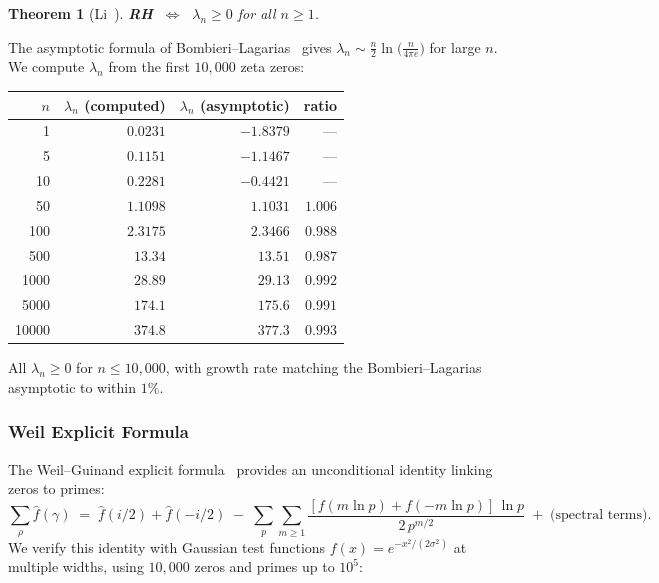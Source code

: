 \documentclass[11pt,a4paper]{article}
\theoremstyle{plain}
\newtheorem{theorem}{Theorem}[section]
\theoremstyle{remark}
\begin{document}
\begin{theorem}[Li~\cite{li1997}]\label{thm:li}
\textbf{RH} $\;\Longleftrightarrow\;$ $\lambda_n \geq 0$ for all $n\geq 1$.
\end{theorem}

\noindent The asymptotic formula of Bombieri--Lagarias~\cite{bombieri-lagarias1999}
gives $\lambda_n \sim \tfrac{n}{2}\ln\!\bigl(\tfrac{n}{4\pi e}\bigr)$
for large $n$.  We compute $\lambda_n$ from the first $10{,}000$ zeta
zeros:

\begin{center}\small
\begin{tabular}{@{}rrrr@{}}
\toprule
$n$ & $\lambda_n$ (computed) & $\lambda_n$ (asymptotic) & ratio\\
\midrule
1   & $0.0231$ & $-1.8379$ & ---\\
5   & $0.1151$ & $-1.1467$ & ---\\
10  & $0.2281$ & $-0.4421$ & ---\\
50  & $1.1098$ & $1.1031$ & $1.006$\\
100 & $2.3175$ & $2.3466$ & $0.988$\\
500 & $13.34$  & $13.51$  & $0.987$\\
1000& $28.89$ & $29.13$  & $0.992$\\
5000& $174.1$ & $175.6$  & $0.991$\\
10000& $374.8$ & $377.3$ & $0.993$\\
\bottomrule
\end{tabular}
\end{center}

\noindent All $\lambda_n \geq 0$ for $n\leq 10{,}000$, with growth rate
matching the Bombieri--Lagarias asymptotic to within $1\%$.

\subsubsection{Weil Explicit Formula}
\label{sec:weil-explicit}

The Weil--Guinand explicit formula~\cite{weil1952,guinand1947}
provides an unconditional identity linking zeros to primes:
\[
  \sum_\rho \hat f(\gamma) \;=\; \hat f(i/2) + \hat f(-i/2)
  \;-\; \sum_p\sum_{m\geq 1} \frac{[f(m\ln p)+f(-m\ln p)]\,\ln p}
         {2\,p^{m/2}}
  \;+\; \text{(spectral terms)}.
\]
We verify this identity with Gaussian test functions
$f(x) = e^{-x^2/(2\sigma^2)}$ at multiple widths, using $10{,}000$
zeros and primes up to $10^5$:
\end{document}

